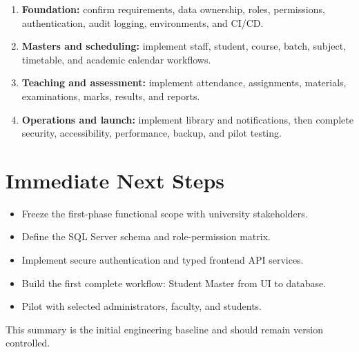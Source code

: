\documentclass[10pt,a4paper]{article}
\begin{document}
\begin{enumerate}[leftmargin=1.5em,itemsep=3pt]
  \item \textbf{Foundation:} confirm requirements, data ownership, roles, permissions,
        authentication, audit logging, environments, and CI/CD.
  \item \textbf{Masters and scheduling:} implement staff, student, course, batch,
        subject, timetable, and academic calendar workflows.
  \item \textbf{Teaching and assessment:} implement attendance, assignments,
        materials, examinations, marks, results, and reports.
  \item \textbf{Operations and launch:} implement library and notifications, then
        complete security, accessibility, performance, backup, and pilot testing.
\end{enumerate}

\section{Immediate Next Steps}

\begin{itemize}
  \item Freeze the first-phase functional scope with university stakeholders.
  \item Define the SQL Server schema and role-permission matrix.
  \item Implement secure authentication and typed frontend API services.
  \item Build the first complete workflow: Student Master from UI to database.
  \item Pilot with selected administrators, faculty, and students.
\end{itemize}

\vfill
\begin{center}
\small\color{textgray}
This summary is the initial engineering baseline and should remain version controlled.
\end{center}
\end{document}
